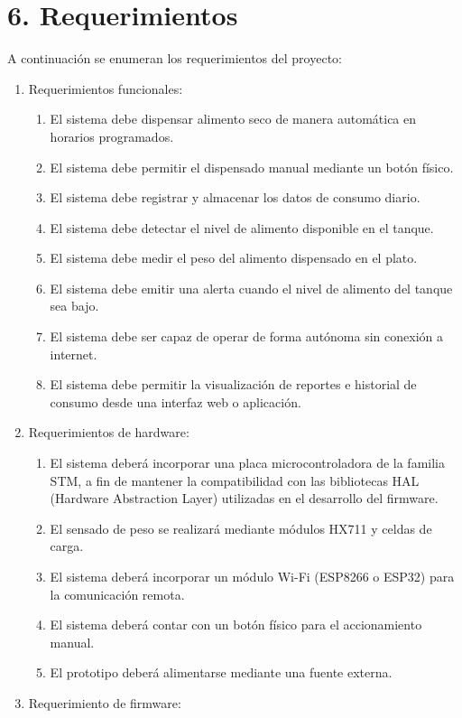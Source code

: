 \documentclass[
11pt, %
]{charter}
\begin{document}
\section{6. Requerimientos}
\label{sec:requerimientos}
A continuación se enumeran los requerimientos del proyecto:
\begin{enumerate}
	\item Requerimientos funcionales:
		\begin{enumerate}
			\item El sistema debe dispensar alimento seco de manera automática en horarios programados.
			\item El sistema debe permitir el dispensado manual mediante un botón físico.
			\item El sistema debe registrar y almacenar los datos de consumo diario.
			\item El sistema debe detectar el nivel de alimento disponible en el tanque.
			\item El sistema debe medir el peso del alimento dispensado en el plato.
			\item El sistema debe emitir una alerta cuando el nivel de alimento del tanque sea bajo.
			\item El sistema debe ser capaz de operar de forma autónoma sin conexión a internet.
			\item El sistema debe permitir la visualización de reportes e historial de consumo desde una interfaz web o aplicación.
		\end{enumerate}
	\item Requerimientos de hardware:
		\begin{enumerate}
			\item El sistema deberá incorporar una placa microcontroladora de la familia STM, a fin de mantener la compatibilidad con las bibliotecas HAL (Hardware Abstraction Layer) utilizadas en el desarrollo del firmware.
			\item El sensado de peso se realizará mediante módulos HX711 y celdas de carga.
			\item El sistema deberá incorporar un módulo Wi-Fi (ESP8266 o ESP32) para la comunicación remota.
			\item El sistema deberá contar con un botón físico para el accionamiento manual.
			\item El prototipo deberá alimentarse mediante una fuente externa.
		\end{enumerate}
	\item Requerimiento de firmware:
		\begin{enumerate}

\end{enumerate}
\end{enumerate}
\end{document}

